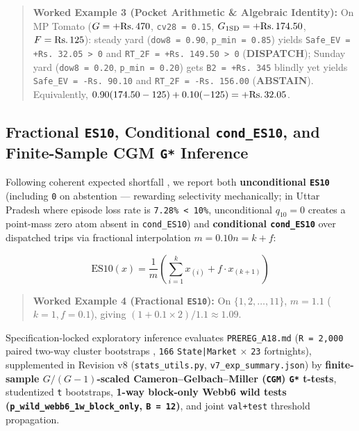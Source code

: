 \documentclass[11pt,a4paper]{article}
\begin{document}
\begin{quote}
\textbf{Worked Example 3 (Pocket Arithmetic \& Algebraic Identity):} On MP Tomato ($G = +\text{Rs.\,}470$, \texttt{cv28 = 0.15}, $G_{\text{1SD}} = +\text{Rs.\,}174.50$, $F = \text{Rs.\,}125$): steady yard (\texttt{dow8 = 0.90}, \texttt{p\_min = 0.85}) yields \texttt{Safe\_EV = +Rs.\,32.05 > 0} and \texttt{RT\_2F = +Rs.\,149.50 > 0} (\textbf{DISPATCH}); Sunday yard (\texttt{dow8 = 0.20}, \texttt{p\_min = 0.20}) gets \texttt{B2 = +Rs.\,345} blindly yet yields \texttt{Safe\_EV = -Rs.\,90.10} and \texttt{RT\_2F = -Rs.\,156.00} (\textbf{ABSTAIN}). Equivalently, $0.90(174.50 - 125) + 0.10(-125) = +\text{Rs.\,}32.05$.

\end{quote}

\subsection{Fractional \texttt{ES10}, Conditional \texttt{cond\_ES10}, and Finite-Sample CGM \texttt{G*} Inference}

Following coherent expected shortfall \citep{rockafellar2000cvar}, we report both \textbf{unconditional \texttt{ES10}} (including \texttt{0} on abstention --- rewarding selectivity mechanically; in Uttar Pradesh where episode loss rate is \texttt{7.28\% < 10\%}, unconditional $q_{10} = 0$ creates a point-mass zero atom absent in \texttt{cond\_ES10}) and \textbf{conditional \texttt{cond\_ES10}} over dispatched trips via fractional interpolation $m = 0.10n = k + f$:

\begin{equation}
\text{ES10}(x) = \frac{1}{m}\left(\sum_{i=1}^{k} x_{(i)} + f \cdot x_{(k+1)}\right)
\end{equation}

\begin{quote}
\textbf{Worked Example 4 (Fractional \texttt{ES10}):} On $\{1, 2, \dots, 11\}$, $m = 1.1$ ($k = 1, f = 0.1$), giving $(1 + 0.1 \times 2)/1.1 \approx 1.09$.

\end{quote}

Specification-locked exploratory inference evaluates \texttt{PREREG\_A18.md} (\texttt{R = 2,000} paired two-way cluster bootstraps \citep{phipson2010permutation,holm1979simple}, \texttt{166} \texttt{State|Market} $\times$ \texttt{23} fortnights), supplemented in Revision v8 (\texttt{stats\_utils.py}, \texttt{v7\_exp\_summary.json}) by \textbf{finite-sample $G/(G-1)$-scaled Cameron--Gelbach--Miller (\texttt{CGM}) \texttt{G*} t-tests}, studentized \texttt{t} bootstraps, \textbf{1-way block-only Webb6 wild tests (\texttt{p\_wild\_webb6\_1w\_block\_only}, \texttt{B = 12})}, and joint \texttt{val+test} threshold propagation.
\end{document}
